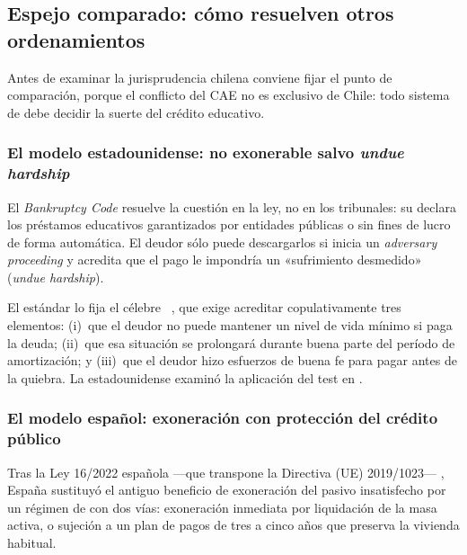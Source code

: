 \bloqueJurisprudencial
\label{sec:cap10-juris}

\subsection{Espejo comparado: cómo resuelven otros ordenamientos}

Antes de examinar la jurisprudencia chilena conviene fijar el punto de comparación, porque el
conflicto del CAE no es exclusivo de Chile: todo sistema de \discharge{} debe decidir la suerte
del crédito educativo.

\subsubsection{El modelo estadounidense: no exonerable salvo \emph{undue hardship}}

El \emph{Bankruptcy Code} \parencite{us-bankruptcy-code} resuelve la cuestión en la ley, no en
los tribunales: su  declara los préstamos educativos garantizados
por entidades públicas o sin fines de lucro  de forma automática. El
deudor sólo puede descargarlos si inicia un \emph{adversary proceeding} y acredita que el pago
le impondría un «sufrimiento desmedido» (\emph{undue hardship}).

El estándar lo fija el célebre \ \parencite{us-brunner}, que exige acreditar copulativamente tres elementos: (i)~que
el deudor no puede mantener un nivel de vida mínimo si paga la deuda; (ii)~que esa situación
se prolongará durante buena parte del período de amortización; y (iii)~que el deudor hizo
esfuerzos de buena fe para pagar antes de la quiebra. La \cs{} estadounidense examinó la
aplicación del test en 
\parencite{us-espinosa}.

\subsubsection{El modelo español: exoneración con protección del crédito público}

Tras la Ley 16/2022 española ---que transpone la Directiva (UE) 2019/1023---
\parencite{esp-ley16-2022, ue-directiva-2019-1023}, España sustituyó el antiguo beneficio de
exoneración del pasivo insatisfecho por un régimen de  con dos vías: exoneración inmediata por liquidación de la masa activa, o
sujeción a un plan de pagos de tres a cinco años que preserva la vivienda habitual.

